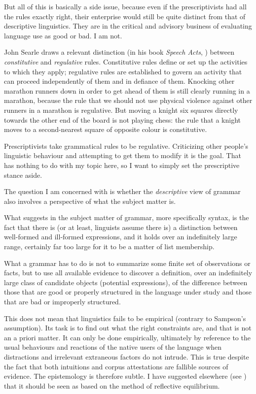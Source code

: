 \documentclass[output=paper]{langscibook}
\begin{document}
But all of this is basically a side issue, because even if the prescriptivists had all the rules exactly right, their enterprise would still be quite distinct from that of descriptive linguistics. They are in the critical and advisory business of evaluating language use as good or bad. I am not.

John Searle draws a relevant distinction (in his book \textit{Speech Acts}, \citeyear{Searle69}) between \emph{constitutive} and \emph{regulative} rules.  Constitutive rules define or set up the activities to which they apply; regulative rules are established to govern an activity that can proceed independently of them and in defiance of them.  Knocking other marathon runners down in order to get ahead of them is still clearly running in a marathon, because the rule that we should not use physical violence against other runners in a marathon is regulative. But moving a knight six squares directly towards the other end of the board is not playing chess: the rule that a knight moves to a second-nearest square of opposite colour is constitutive.

Prescriptivists take grammatical rules to be regulative. Criticizing other people's linguistic behaviour and attempting to get them to modify it is the goal.  That has nothing to do with my topic here, so I want to simply set the prescriptive stance aside.

The question I am concerned with is whether the \emph{descriptive} view of grammar also involves a  perspective of what the subject matter is.

What suggests  in the subject matter of grammar, more specifically syntax, is the fact that there is (or at least, linguists assume there is) a distinction between well-formed and ill-formed expressions, and it holds over an indefinitely large range, certainly far too large for it to be a matter of list membership.

What a grammar has to do is not to summarize some finite set of observations or facts, but to use all available evidence to discover a definition, over an indefinitely large class of candidate objects (potential expressions), of the difference between those that are good or properly structured in the language under study and those that are bad or improperly structured.

This does not mean that linguistics fails to be empirical (contrary to Sampson's assumption). Its task is to find out what the right constraints are, and that is not an a priori matter. It can only be done empirically, ultimately by reference to the usual behaviours and reactions of the native users of the language when distractions and irrelevant extraneous factors do not intrude. This is true despite the fact that both intuitions and corpus attestations are fallible sources of evidence. The epistemology is therefore subtle. I have suggested elsewhere (see \citealt{Pullum17}) that it should be seen as based on the method of reflective equilibrium.
\end{document}
